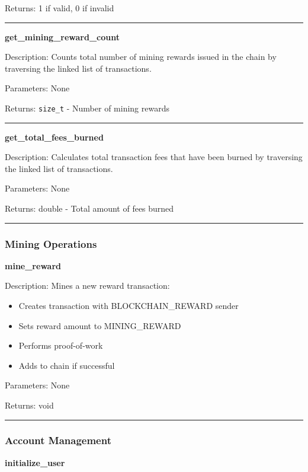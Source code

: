 \documentclass[12pt]{article}
\begin{document}
Returns: 1 if valid, 0 if invalid

\vspace{1em}
\hrule
\vspace{1em}

\textbf{get\_mining\_reward\_count}

Description: Counts total number of mining rewards issued in the chain by traversing the linked list of transactions.

Parameters: None

Returns: \texttt{size\_t} - Number of mining rewards

\vspace{1em}
\hrule
\vspace{1em}

\textbf{get\_total\_fees\_burned}

Description: Calculates total transaction fees that have been burned by traversing the linked list of transactions.

Parameters: None

Returns: double - Total amount of fees burned

\vspace{1em}
\hrule
\vspace{1em}

\subsubsection{Mining Operations}
\textbf{mine\_reward}

Description: Mines a new reward transaction:
\begin{itemize}
\item Creates transaction with BLOCKCHAIN\_REWARD sender
\item Sets reward amount to MINING\_REWARD
\item Performs proof-of-work
\item Adds to chain if successful
\end{itemize}

Parameters: None

Returns: void

\vspace{1em}
\hrule
\vspace{1em}

\subsubsection{Account Management}
\textbf{initialize\_user}
\end{document}
